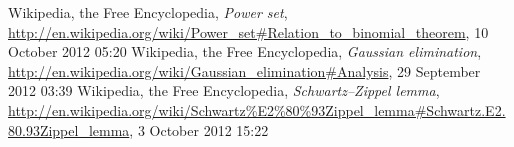 \documentclass{tufte-handout}
\begin{document}
\newpage
{}

\begin{thebibliography}{9}
 Wikipedia, the Free Encyclopedia, \emph{Power set},  \url{http://en.wikipedia.org/wiki/Power_set#Relation_to_binomial_theorem}, 10 October 2012 05:20
 Wikipedia, the Free Encyclopedia, \emph{Gaussian elimination}, \url{http://en.wikipedia.org/wiki/Gaussian_elimination#Analysis}, 29 September 2012 03:39
 Wikipedia, the Free Encyclopedia, \emph{Schwartz–Zippel lemma}, \url{http://en.wikipedia.org/wiki/Schwartz\%E2\%80\%93Zippel_lemma#Schwartz.E2.80.93Zippel_lemma}, 3 October 2012 15:22
\end{thebibliography}
\end{document}
